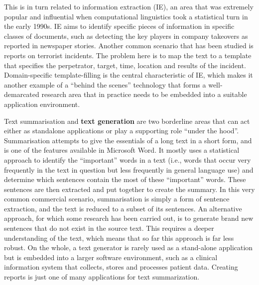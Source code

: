 \begin{multicols}{2}
This is in turn related to information extraction (IE), an area that was extremely popular and influential when computational linguistics took a statistical turn in the early 1990s. IE aims to identify specific pieces of information in specific classes of documents, such as detecting the key players in company takeovers as reported in newspaper stories. Another common scenario that has been studied is reports on terrorist incidents. The problem here is to map the text to a template that specifies the perpetrator, target, time, location and results of the incident. Domain-specific template-filling is the central characteristic of IE, which makes it another example of a “behind the scenes” technology that forms a well-demarcated research area that in practice needs to be embedded into a suitable application environment. 

Text summarisation and \textbf{text generation} are two borderline areas that can act either as standalone applications or play a supporting role “under the hood”. Summarisation attempts to give the essentials of a long text in a short form, and is one of the features available in Microsoft Word. It mostly uses a statistical approach to identify the “important” words in a text (i.e., words that occur very frequently in the text in question but less frequently in general language use) and determine which sentences contain the most of these “important” words. These sentences are then extracted and put together to create the summary. In this very common commercial scenario, summarisation is simply a form of sentence extraction, and the text is reduced to a subset of its sentences. An alternative approach, for which some research has been carried out, is to generate brand new sentences that do not exist in the source text. This requires a deeper understanding of the text, which means that so far this approach is far less robust. On the whole, a text generator is rarely used as a stand-alone application but is embedded into a larger software environment, such as a clinical information system that collects, stores and processes patient data. Creating reports is just one of many applications for text summarization.



\end{multicols}
